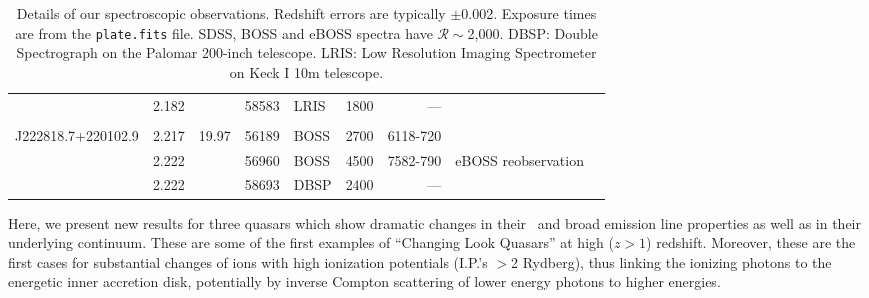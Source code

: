 \documentclass[a4paper,fleqn,usenatbib]{mnras}
\begin{document}
\begin{table}
\begin{tabular}{l l   r ll   r r r l}
                                         &  2.182                           &                          &  58583                     & LRIS              &  1800                   &  ---                             & \\
                                        &                                      &                          &                                 &                            &                    &                              &                                & \\
    J222818.7+220102.9   & 2.217                           & 19.97                &  56189                  &  BOSS             &  2700                 &   6118-720          & \\
                                          & 2.222                         &                          &  56960                    & BOSS             &  4500                  &   7582-790          & eBOSS reobservation \\ 
                                         &  2.222                         &                          &  58693                  &  DBSP             & 2400                   &    ---                        &    \\
    \hline \hline   
  \end{tabular}
  \caption{
    Details of our spectroscopic observations.
    Redshift errors are typically  $\pm$0.002. 
    Exposure times are from the {\tt plate.fits} file.  SDSS, BOSS and  eBOSS spectra have $\mathcal{R}\sim$2,000.
    DBSP: Double Spectrograph on the Palomar 200-inch telescope.
    LRIS:  Low Resolution Imaging Spectrometer on Keck I 10m telescope.
  } 
  \label{tab:obs_notes}
\end{table}

Here, we present new results for three quasars which show dramatic
changes in their \civ\ and \ciii broad emission line properties as
well as in their underlying continuum. These are some of the first
examples of ``Changing Look Quasars'' at high ($z>1$)
redshift. Moreover, these are the first cases for substantial changes
of ions with high ionization potentials (I.P.'s $>$2 Rydberg), thus
linking the ionizing photons to the energetic inner accretion disk,
potentially by inverse Compton scattering of lower energy photons to
higher energies.
\end{document}
